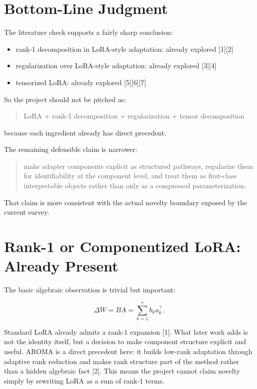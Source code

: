 \documentclass[11pt]{article}
\begin{document}
\section{Bottom-Line Judgment}

The literature check supports a fairly sharp conclusion:

\begin{itemize}
\item rank-1 decomposition in LoRA-style adaptation: already explored [1][2]
\item regularization over LoRA-style adaptation: already explored [3][4]
\item tensorized LoRA: already explored [5][6][7]
\end{itemize}

So the project should not be pitched as:

\begin{quote}
LoRA + rank-1 decomposition + regularization + tensor decomposition
\end{quote}

because each ingredient already has direct precedent.

The remaining defensible claim is narrower:

\begin{quote}
make adapter components explicit as structured pathways, regularize them for identifiability at the component level, and treat them as first-class interpretable objects rather than only as a compressed parameterization.
\end{quote}

That claim is more consistent with the actual novelty boundary exposed by the current survey.

\section{Rank-1 or Componentized LoRA: Already Present}

The basic algebraic observation is trivial but important:

\[
\Delta W = BA = \sum_{k=1}^{r} b_k a_k^\top.
\]

Standard LoRA already admits a rank-1 expansion [1]. What later work adds is not the identity itself, but a decision to make component structure explicit and useful. AROMA is a direct precedent here: it builds low-rank adaptation through adaptive rank reduction and makes rank structure part of the method rather than a hidden algebraic fact [2]. This means the project cannot claim novelty simply by rewriting LoRA as a sum of rank-1 terms.
\end{document}
